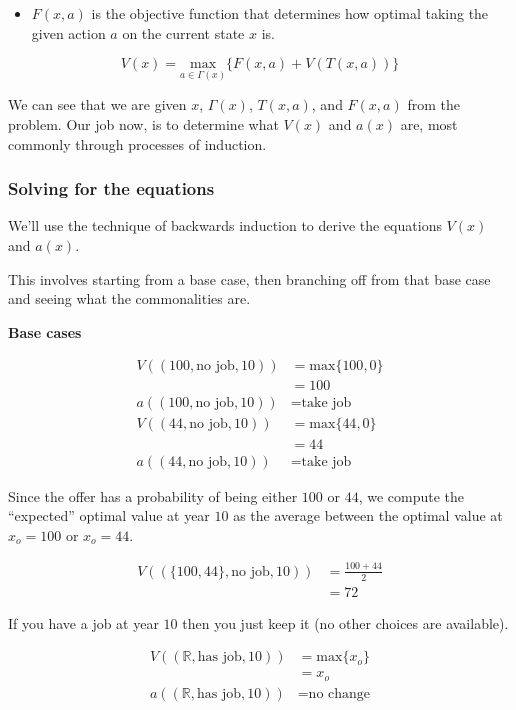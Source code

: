 \documentclass[a4paper, 12pt]{article}
\begin{document}
\begin{itemize}
  \item $F(x,a)$ is the objective function that determines how optimal taking the given action $a$ on the current state $x$ is.
\end{itemize}

\[
  V(x)=\underset{a \in \Gamma(x)}{\text{max}}\{F(x,a)+V(T(x,a))\}
\]

We can see that we are given $x$, $\Gamma(x)$, $T(x, a)$, and $F(x, a)$ from the problem. Our job now, is to determine what $V(x)$ and $a(x)$ are, most commonly through processes of induction.

\subsubsection{Solving for the equations}

We'll use the technique of backwards induction to derive the equations $V(x)$ and $a(x)$.

This involves starting from a base case, then branching off from that base case and seeing what the commonalities are.

\textbf{Base cases}

\[
\begin{aligned}
  V((100, \text{no job}, 10)) &= \text{max}\{100, 0\} \\
                              &= 100 \\
  a((100, \text{no job}, 10)) &= \text{take job} \\
  V((44, \text{no job}, 10)) &= \text{max}\{44, 0\} \\
                             &= 44 \\
  a((44, \text{no job}, 10)) &= \text{take job}
\end{aligned}
\]

Since the offer has a probability of being either $100$ or $44$, we compute the ``expected'' optimal value at year $10$ as the average between the optimal value at $x_{o}=100$ or $x_{o}=44$.

\[
\begin{aligned}
  V((\{100, 44\}, \text{no job}, 10)) &= \frac{100+44}{2} \\
                                                &= 72
\end{aligned}
\]

If you have a job at year $10$ then you just keep it (no other choices are available).

\[
\begin{aligned}
  V((\mathbb{R}, \text{has job}, 10)) &= \text{max}\{x_{o}\} \\
                                                &= x_{o} \\
  a((\mathbb{R}, \text{has job}, 10)) &= \text{no change}
\end{aligned}
\]
\end{document}
